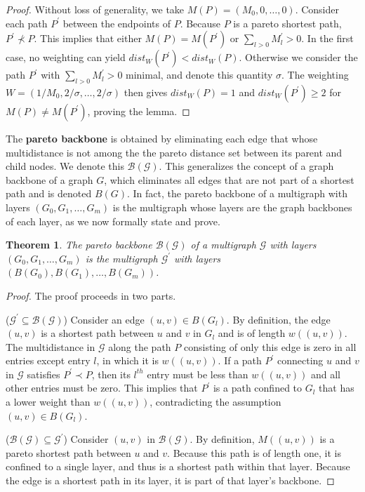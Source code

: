 \documentclass{article}
\newtheorem{theorem}{Theorem}[section]
\begin{document}
\begin{proof}
    Without loss of generality, we take $M(P)=(M_0,0,\ldots,0)$.
    Consider each path $P^\prime$ between the endpoints of $P$.
    Because $P$ is a pareto
    shortest path, $P^\prime \not \prec P$. This implies that either $M(P) = M(P^\prime)$ or
    $\sum_{l>0}M^\prime_l > 0$. In the first case, no weighting can yield $dist_W(P^\prime)<dist_W(P)$.
    Otherwise we consider the path $P^\prime$ with $\sum_{l>0}M^\prime_l>0$ minimal, and denote this
    quantity $\sigma$. The weighting $W=(1/M_0,2/\sigma,\ldots,2/\sigma)$ then gives
    $dist_W(P)=1$ and $dist_W(P^\prime)\geq 2$ for $M(P)\not = M(P^\prime)$, proving the lemma.
\end{proof}

The {\bf pareto backbone} is obtained by eliminating each edge that whose multidistance is not among the
the pareto distance set between its parent and child nodes. We denote this $\mathcal{B}(\mathcal{G})$.
This generalizes the concept of a graph
backbone of a graph $G$, which eliminates all edges that are not part of a shortest path and is denoted
$B(G)$.
In fact, the pareto backbone
of a multigraph with layers $\left(G_0,G_1,\ldots,G_m\right)$ is the multigraph whose layers are the
graph backbones of each layer, as we now formally state and prove.

\begin{theorem}
    The pareto backbone $\mathcal{B}(\mathcal{G})$ of a multigraph $\mathcal{G}$ with layers\\
    $\left(G_0,G_1,\ldots,G_m\right)$ is the multigraph $\mathcal{G}^\prime$ with layers
    $\left(B(G_0),B(G_1),\ldots,B(G_m)\right)$.
\end{theorem}
\begin{proof}
    The proof proceeds in two parts.

    ($\mathcal{G}^\prime\subseteq \mathcal{B}(\mathcal{G})$) Consider an edge $(u,v)\in B(G_l)$.
    By definition, the edge $(u,v)$ is a shortest path between $u$ and $v$ in $G_l$ and is of length
    $w((u,v))$. The multidistance in $\mathcal{G}$ along the path $P$ consisting of only this edge is
    zero in all entries except entry $l$, in which it is $w((u,v))$. If a path $P^\prime$ connecting
    $u$ and $v$ in $\mathcal{G}$ satisfies $P^\prime \prec P$, then its $l^{th}$ entry must be less
    than $w((u,v))$ and all other entries must be zero. This implies that $P^\prime$ is a path confined
    to $G_l$ that has a lower weight than $w((u,v))$, contradicting the assumption $(u,v)\in B(G_l)$.

    ($\mathcal{B}(\mathcal{G}) \subseteq \mathcal{G}^\prime$) Consider $(u,v)$ in
    $\mathcal{B}(\mathcal{G})$. By definition, $M((u,v))$ is a pareto shortest path between $u$ and $v$.
    Because this path is of length one, it is confined to a single layer, and thus is a shortest path
    within that layer. Because the edge is a shortest path in its layer, it is part of that layer's
    backbone.
\end{proof}
\end{document}
